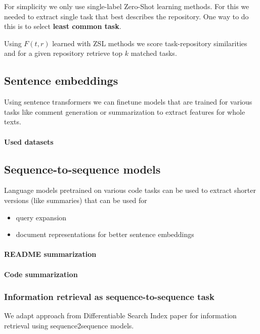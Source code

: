 \documentclass[11pt]{report}
\begin{document}
For simplicity we only use single-label Zero-Shot learning methods. For this we needed to extract single task that best describes the repository. One way to do this is to select \textbf{least common task}.

Using \(F(t, r)\) learned with ZSL methods we score task-repository similarities and for a given repository retrieve top \(k\) matched tasks.

\subsection{Sentence embeddings}

Using sentence transformers we can finetune models that are trained for various tasks like comment generation or summarization to extract features for whole texts.

\paragraph{Used datasets}

\subsection{Sequence-to-sequence models}

Language models pretrained on various code tasks can be used to extract shorter versions (like summaries) that can be used for
\begin{itemize}
    \item query expansion
    \item document representations for better sentence embeddings
\end{itemize}


\paragraph{README summarization}

\paragraph{Code summarization}

\subsubsection{Information retrieval as sequence-to-sequence task}

We adapt approach from Differentiable Search Index \cite{differentiable_search_index} paper for information retrieval using sequence2sequence models.
\end{document}
